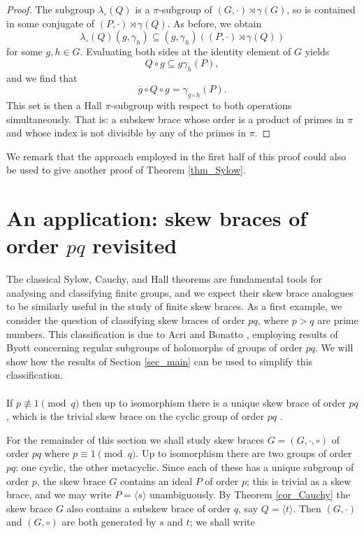 \documentclass[12pt,a4paper, reqno]{amsart}
\theoremstyle{definition}
\renewcommand{\bar}{\overline}
\begin{document}
\begin{proof}
The subgroup $ \lambda_{\circ}(Q) $ is a $ \pi $-subgroup of $ (G,\cdot) \rtimes \gamma(G) $, so is contained in some conjugate of $ (P,\cdot) \rtimes \gamma(Q) $. As before, we obtain
\[ \lambda_{\circ}(Q) (g,\gamma_{h}) \subseteq (g,\gamma_{h})\left( (P,\cdot) \rtimes \gamma(Q) \right) \] 
for some $ g,h \in G $. Evaluating both sides at the identity element of $ G $ yields 
\[ Q \circ g \subseteq g \gamma_{h}(P), \]
and we find that 
\[ \bar{g} \circ Q \circ g  = \gamma_{\bar{g} \circ h}(P). \]
This set is then a Hall $ \pi $-subgroup with respect to both operations simultaneously. That is: a subskew brace whose order is a product of primes in $ \pi $ and whose index is not divisible by any of the primes in $ \pi $. 
\end{proof}

We remark that the approach employed in the first half of this proof could also be used to give another proof of Theorem \ref{thm_Sylow}.

\section{An application: skew braces of order $ pq $ revisited}

The classical Sylow, Cauchy, and Hall theorems are fundamental tools for analysing and classifying finite groups, and we expect their skew brace analogues to be similarly useful in the study of finite skew braces. As a first example, we consider the question of classifying skew braces of order $ pq $, where $ p > q $ are prime numbers. This classification is due to Acri and Bonatto \cite{AcB20}, employing results of Byott \cite{By04c} concerning regular subgroups of holomorphs of groups of order $ pq $. We will show how the results of Section \ref{sec_main} can be used to simplify this classification. 
\\ \\
If $ p \not \equiv 1 \pmod{q} $ then up to isomorphism there is a unique skew brace of order $ pq $, which is the trivial skew brace on the cyclic group of order $ pq $ \cite[Theorem A.8]{SV18}. 

For the remainder of this section we shall study skew braces $ G=(G,\cdot,\circ) $ of order $ pq $ where $ p \equiv 1 \pmod{q} $. Up to isomorphism there are two groups of order $ pq $: one cyclic, the other metacyclic. Since each of these has a unique subgroup of order $ p $, the skew brace $ G $  contains an ideal $ P $ of order $ p $; this is trivial as a skew brace, and we may write $ P = \langle s \rangle $ unambiguously. By Theorem \ref{cor_Cauchy} the skew brace $ G $ also contains a subskew brace of order $ q $, say $ Q = \langle t \rangle $. Then $ (G,\cdot) $ and $ (G,\circ) $ are both generated by $ s $ and $ t $; we shall write
\end{document}
